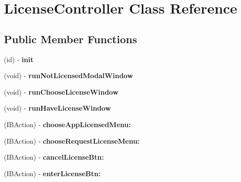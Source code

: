 \hypertarget{interface_license_controller}{
\section{LicenseController Class Reference}
\label{interface_license_controller}
}
\subsection*{Public Member Functions}
\begin{DoxyCompactItemize}
\item 
\hypertarget{interface_license_controller_a8f07fde896fb0274eaffb30d36c3bca8}{
(id) -\/ {\bfseries init}}
\label{interface_license_controller_a8f07fde896fb0274eaffb30d36c3bca8}

\item 
\hypertarget{interface_license_controller_a8d7f4e837404d7f1f325cde6a677162b}{
(void) -\/ {\bfseries runNotLicensedModalWindow}}
\label{interface_license_controller_a8d7f4e837404d7f1f325cde6a677162b}

\item 
\hypertarget{interface_license_controller_a0dd97f8862e8210f7036582af3366f20}{
(void) -\/ {\bfseries runChooseLicenseWindow}}
\label{interface_license_controller_a0dd97f8862e8210f7036582af3366f20}

\item 
\hypertarget{interface_license_controller_ab9d8333c1fc02102abd8d648517232a2}{
(void) -\/ {\bfseries runHaveLicenseWindow}}
\label{interface_license_controller_ab9d8333c1fc02102abd8d648517232a2}

\item 
\hypertarget{interface_license_controller_a795377cae3986256d6f1ac5e034fa37e}{
(IBAction) -\/ {\bfseries chooseAppLicensedMenu:}}
\label{interface_license_controller_a795377cae3986256d6f1ac5e034fa37e}

\item 
\hypertarget{interface_license_controller_a8c65041a6b0c141b30b64e1672c9beec}{
(IBAction) -\/ {\bfseries chooseRequestLicenseMenu:}}
\label{interface_license_controller_a8c65041a6b0c141b30b64e1672c9beec}

\item 
\hypertarget{interface_license_controller_aaa0ef071af91e0ff38caaf96a26fa4fa}{
(IBAction) -\/ {\bfseries cancelLicenseBtn:}}
\label{interface_license_controller_aaa0ef071af91e0ff38caaf96a26fa4fa}

\item 
\hypertarget{interface_license_controller_adaaeaccd1e676b7cbfdc1b162ddeecd2}{
(IBAction) -\/ {\bfseries enterLicenseBtn:}}
\label{interface_license_controller_adaaeaccd1e676b7cbfdc1b162ddeecd2}


\end{DoxyCompactItemize}
